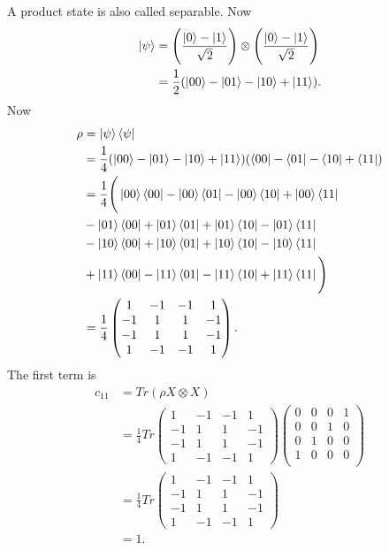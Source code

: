 \documentclass[10pt]{article}
\begin{document}
A product state is also called separable. Now 
\begin{align*}
\ket{\psi} &= \Bigg( \frac{\ket{0} - \ket{1}}{\sqrt{2}}\Bigg) \otimes \Bigg( \frac{\ket{0} - \ket{1}}{\sqrt{2}}\Bigg) \\
                &= \frac{1}{2} (\ket{00} - \ket{01} - \ket{10} + \ket{11}).
\end{align*}
Now
\begin{align*}
\rho &= \ket{\psi} \bra{\psi} \\
        &= \frac{1}{4}  (\ket{00} - \ket{01} - \ket{10} + \ket{11})  (\bra{00} - \bra{01} - \bra{10} + \bra{11}) \\
        &= \frac{1}{4} \Bigg( \ket{00} \bra{00} - \ket{00} \bra{01} -\ket{00} \bra{10} + \ket{00} \bra{11} \\
        &- \ket{01} \bra{00} + \ket{01} \bra{01} + \ket{01} \bra{10} - \ket{01} \bra{11} \\
        &- \ket{10} \bra{00} + \ket{10} \bra{01} + \ket{10} \bra{10} - \ket{10} \bra{11} \\
        &+ \ket{11} \bra{00} - \ket{11} \bra{01} - \ket{11} \bra{10} + \ket{11} \bra{11} \Bigg) \\
        &=
        \frac{1}{4} 
        \begin{pmatrix}
        1 & -1 & -1 & 1 \\
        -1 & 1 & 1 & -1 \\
        -1 & 1 & 1 & -1 \\
        1 & -1 & -1 & 1
        \end{pmatrix}.
\end{align*}
The first term is
\begin{align*}
c_{11} &= Tr(\rho X \otimes X) \\
          &= \frac{1}{4} Tr
        \begin{pmatrix}
        1 & -1 & -1 & 1 \\
        -1 & 1 & 1 & -1 \\
        -1 & 1 & 1 & -1 \\
        1 & -1 & -1 & 1
        \end{pmatrix}
        \begin{pmatrix}
        0 & 0 & 0 & 1 \\
        0 & 0 & 1 & 0 \\
        0 & 1 & 0 & 0 \\
        1 & 0 & 0 & 0 \\
        \end{pmatrix} \\
        &= 
        \frac{1}{4} Tr
        \begin{pmatrix}
        1 & -1 & -1 & 1 \\
        -1 & 1 & 1 & -1 \\
        -1 & 1 & 1 & -1 \\
        1 & -1 & -1 & 1
        \end{pmatrix} \\
        &= 1.
\end{align*}
\end{document}
